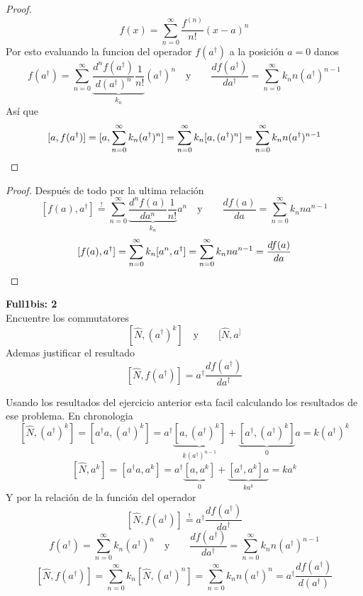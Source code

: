 \begin{solucion}
\begin{proof}
$$
	f(x) = \sum_{n=0}^\infty \frac{f^(n)}{n!}(x-a)^n
$$
Por esto evaluando la funcion del operador $f(a^\dagger)$ a la posición $a=0$
danos
$$
	f(a^\dagger) = \sum_{n=0}^\infty \underbrace{\frac{d^n f(a^\dagger)}{d
(a^\dagger)^n} \frac{1}{n!}}_{k_n} (a^\dagger)^n \quad \text{y} \qquad \frac{d
f(a^\dagger)}{d a^\dagger} = \sum_{n=0}^\infty k_n n (a^\dagger)^{n-1}
$$
Así que
$$
	[a, f(a^\dagger)] = [a, \sum_{n=0}^\infty k_n (a^\dagger)^n ] =
\sum_{n=0}^\infty k_n [a, (a^\dagger)^n] = \sum_{n=0}^\infty k_n
n(a^\dagger)^{n-1} \qedhere
$$
\end{proof}
\begin{proof}
Después de todo por la ultima relación
$$
	[f(a), a^\dagger] \overset{!}{=} \sum_{n=0}^\infty \underbrace{\frac{d^n
f(a)}{d a^n} \frac{1}{n!}}_{k_n} a^n \quad \text{y} \qquad \frac{d f(a)}{da} =
\sum_{n=0}^\infty k_n n a^{n-1}
$$
$$
	[f(a), a^\dagger] = \sum_{n=0}^\infty k_n [a^n, a^\dagger] =
\sum_{n=0}^\infty k_n n a^{n-1} = \frac{d f(a)}{da} \qedhere
$$
\end{proof}
\end{solucion}

\begin{ejercicio}
\textbf{Full1bis: 2} \\
Encuentre los commutatores
$$
	[\hat N, (a^\dagger)^k] \quad \text{y} \qquad [\hat N, a^]	
$$
Ademas justificar el resultado 
$$
	[\hat N, f(a^\dagger)] = a^\dagger \frac{d f(a^\dagger)}{d a^\dagger}
$$
\end{ejercicio}
\begin{solucion}
Usando los resultados del ejercicio anterior esta facil calculando los
resultados de ese problema. En chronologia
$$
	[\hat N, (a^\dagger)^k] = [a^\dagger a, (a^\dagger)^k] = a^\dagger
\underbrace{[a, (a^\dagger)^k]}_{k (a^\dagger)^{n-1}} + \underbrace{[a^\dagger,
(a^\dagger)^k ]}_{0} a = k (a^\dagger)^k
$$
$$
	[\hat N, a^k] = [a^\dagger a, a^k] = a^\dagger \underbrace{[a, a^k]}_0 +
\underbrace{[a^\dagger, a^k] a}_{ka^k} = k a^k
$$
Y por la relación de la función del operador
$$
	[\hat N, f(a^\dagger)] \overset{!}{=} a^\dagger \frac{d f(a^\dagger)}{d
a^\dagger}
$$
$$
	f(a^\dagger) = \sum_{n=0}^\infty k_n (a^\dagger)^n \quad \text{y} \qquad
\frac{d f(a^\dagger)}{d a^\dagger} = \sum_{n=0}^\infty k_n n (a^\dagger)^{n-1}
$$
$$
	[\hat N, f(a^\dagger)] = \sum_{n=0}^\infty k_n [\hat N, (a^\dagger)^n] =
\sum_{n=0}^\infty k_n n (a^\dagger)^n = a^\dagger \frac{d f(a^\dagger)}{d
(a^\dagger)}
$$
\end{solucion}

